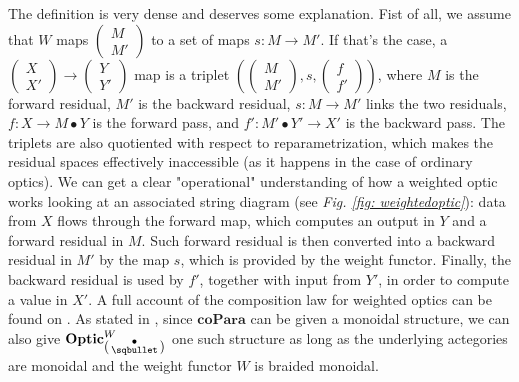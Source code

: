 \documentclass[11pt,a4paper,openright,twoside]{report}
\theoremstyle{plain}
\theoremstyle{definition}
\begin{document}
The definition is very dense and deserves some explanation. Fist of all, we assume that $W$ maps $\left(\begin{smallmatrix}M \\ M'\end{smallmatrix}\right)$ to a set of maps $s: M \to M'$. If that's the case, a $\left(\begin{smallmatrix}X\\X'\end{smallmatrix}\right) \to \left(\begin{smallmatrix}Y\\Y'\end{smallmatrix}\right)$ map is a triplet $\left(\left(\begin{smallmatrix}M\\M'\end{smallmatrix}\right),s,\left(\begin{smallmatrix}f\\f'\end{smallmatrix}\right)\right)$, where $M$ is the forward residual, $M'$ is the backward residual, $s: M \to M'$ links the two residuals, $f: X \to M \bullet Y$ is the forward pass, and $f': M' \bullet Y' \to X'$ is the backward pass.
The triplets are also quotiented with respect to reparametrization, which makes the residual spaces effectively inaccessible (as it happens in the case of ordinary optics). We can get a clear "operational" understanding of how a weighted optic works looking at an associated string diagram (see \textit{Fig. \ref{fig: weightedoptic}}): data from $X$ flows through the forward map, which computes an output in $Y$ and a forward residual in $M$. Such forward residual is then converted into a backward residual in $M'$ by the map $s$, which is provided by the weight functor. Finally, the backward residual is used by $f'$, together with input from $Y'$, in order to compute a value in $X'$. A full account of the composition law for weighted optics can be found on \cite{gavranovic2024fundamental}.
As stated in \cite{gavranovic2024fundamental}, since $\mathbf{coPara}$ can be given a monoidal structure, we can also give $\mathbf{Optic}^W_{\left(\begin{smallmatrix}\bullet\\\sqbullet\end{smallmatrix}\right)}$ one such structure as long as the underlying actegories are monoidal and the weight functor $W$ is braided monoidal.
\end{document}
